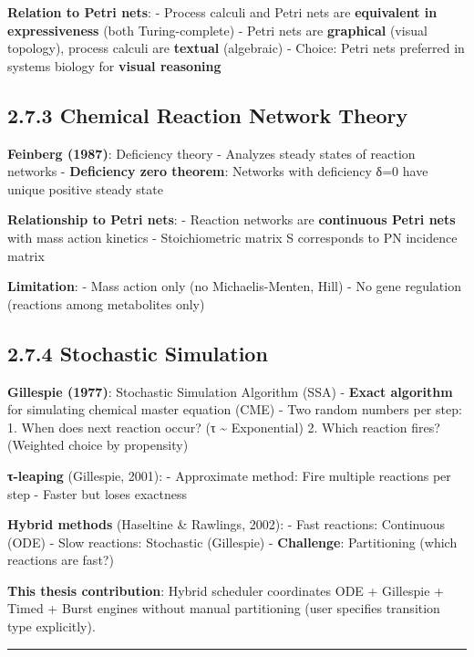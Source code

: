 \textbf{Relation to Petri nets}: - Process calculi and Petri nets are
\textbf{equivalent in expressiveness} (both Turing-complete) - Petri
nets are \textbf{graphical} (visual topology), process calculi are
\textbf{textual} (algebraic) - Choice: Petri nets preferred in systems
biology for \textbf{visual reasoning}

\hypertarget{chemical-reaction-network-theory}{%
\subsection{2.7.3 Chemical Reaction Network
Theory}\label{chemical-reaction-network-theory}}

\textbf{Feinberg (1987)}: Deficiency theory - Analyzes steady states of
reaction networks - \textbf{Deficiency zero theorem}: Networks with
deficiency δ=0 have unique positive steady state

\textbf{Relationship to Petri nets}: - Reaction networks are
\textbf{continuous Petri nets} with mass action kinetics -
Stoichiometric matrix S corresponds to PN incidence matrix

\textbf{Limitation}: - Mass action only (no Michaelis-Menten, Hill) - No
gene regulation (reactions among metabolites only)

\hypertarget{stochastic-simulation}{%
\subsection{2.7.4 Stochastic Simulation}\label{stochastic-simulation}}

\textbf{Gillespie (1977)}: Stochastic Simulation Algorithm (SSA) -
\textbf{Exact algorithm} for simulating chemical master equation (CME) -
Two random numbers per step: 1. When does next reaction occur? (τ
\textasciitilde{} Exponential) 2. Which reaction fires? (Weighted choice
by propensity)

\textbf{τ-leaping} (Gillespie, 2001): - Approximate method: Fire
multiple reactions per step - Faster but loses exactness

\textbf{Hybrid methods} (Haseltine \& Rawlings, 2002): - Fast reactions:
Continuous (ODE) - Slow reactions: Stochastic (Gillespie) -
\textbf{Challenge}: Partitioning (which reactions are fast?)

\textbf{This thesis contribution}: Hybrid scheduler coordinates ODE +
Gillespie + Timed + Burst engines without manual partitioning (user
specifies transition type explicitly).

\begin{center}\rule{0.5\linewidth}{0.5pt}\end{center}


